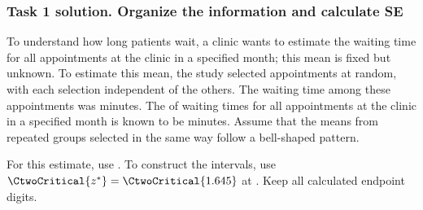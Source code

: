 \subsubsection*{Task 1 solution. Organize the information and calculate SE}
\label{sol:c2-3-a}
To understand how long patients wait, a clinic wants to estimate the  waiting time for all appointments at the clinic in a specified month; this mean is fixed but unknown. To estimate this mean, the study selected  appointments at random, with each selection independent of the others. The  waiting time among these  appointments was  minutes. The  of waiting times for all appointments at the clinic in a specified month is known to be  minutes. Assume that the means from repeated groups selected in the same way follow a bell-shaped pattern.

For this estimate, use  . To construct the intervals, use $\CtwoCritical{z^*}=\CtwoCritical{1.645}$ at . Keep all calculated endpoint digits.

